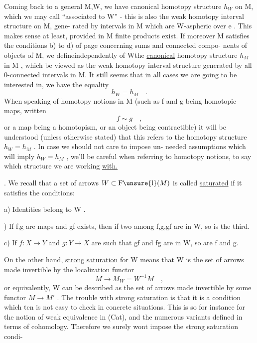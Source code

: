 
Coming back to a general M,W, we have  
canonical homotopy structure $h_W$ on M, which we may call ``associated to
W'' - this is also the weak homotopy interval structure on M, gene-%
rated by intervals in M which are W-aspheric over e . This makes sense
at least, provided in M finite products exist. If moreover M satisfies
the conditions b) to d) of page  concerning sums and connected compo-%
nents of objects of M, we  define\hand{(}independently of W\hand{)}the \uline{canonical}
homotopy structure $h_M$ in M , which  be viewed as the weak homotopy
interval structure generated by all 0-connected intervals in M. It still
seems that in all cases we are going to be interested in, we have the
equality
\[ h_W = h_M \quad . \]
When speaking of homotopy notions in M (such as f and g being homotopic
maps, written
\[ f \sim g \quad , \]
or a map being a homotopism, or an object being contractible) it will be
understood  (unless otherwise stated) that this refers to the
homotopy structure $h_W = h_M$ . In case we should not care to impose \hand{(} un-%
needed assumptions which will imply $h_W = h_M$ , we'll be careful when
referring to homotopy notions, to say which structure we are working
\uline{with.}

. We recall that a set of arrows $W \subset \mathrm{F\unsure{l}}(M)$ is called \uline{saturated} if it
satisfies the conditions:

a) Identities belong to W .

) If f,g are maps and gf exists, then if two among f,g,gf are in
W, so is the third.

c) If $f:X \to Y$ and $g: Y \to X$ are such that gf and fg are in W, so are
f and g.

 On the other hand, \uline{strong saturation} for W means that W is
the set of arrows made invertible by the localization functor
\[ M \longrightarrow M_W = W^{-1}M \quad , \]
 or equivalently,  W can be described as the set of
arrows made invertible by some functor $M \longrightarrow M'$ . The trouble with strong
saturation is that it is a condition which ten is not easy to check
in concrete situations. This is so for instance for the notion of weak
equivalence in (Cat), and the numerous variants defined in terms of
cohomology. Therefore we surely wont impose the strong saturation condi-%

